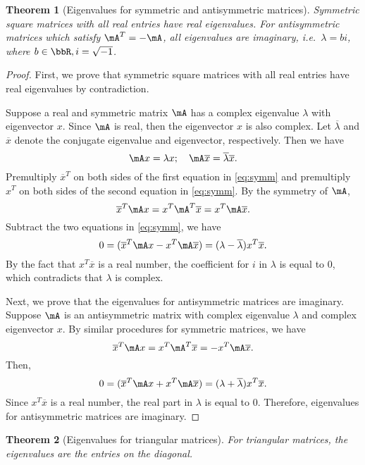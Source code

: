 \documentclass[11pt]{article}
\theoremstyle{plain}
\newtheorem{thm}{Theorem}[section]
\theoremstyle{definition}
\begin{document}
\begin{thm}[Eigenvalues for symmetric and antisymmetric matrices]\label{def:symmeign}
	Symmetric square matrices  with all real entries have real eigenvalues. For antisymmetric matrices which satisfy $\mA^T = - \mA$, all eigenvalues are imaginary, i.e.\ $\lambda = b i$, where $b \in \bbR, i = \sqrt{-1}$.
\end{thm}
\begin{proof}
	First, we prove that symmetric square matrices with all real entries have real eigenvalues by contradiction. 
	
	Suppose a real and symmetric matrix $\mA$ has a complex eigenvalue $\lambda$ with eigenvector $x$. Since $\mA$ is real, then the eigenvector $x$ is also complex. Let $\overline \lambda$ and $\overline x$ denote the conjugate eigenvalue and eigenvector, respectively. Then we have
	\begin{equation}\label{eq:symm}
		\mA x = \lambda x;\quad \mA \overline x = \overline \lambda \overline x.
	\end{equation} 
	Premultiply $\overline x^T$ on both sides of the first equation in \eqref{eq:symm} and premultiply $x^T$ on both sides of the second equation in \eqref{eq:symm}. By the symmetry of $\mA$,
	\[ \overline x^T \mA x  = x^T \mA^T \overline x = x^T \mA \overline x .\]
	Subtract the two equations in \eqref{eq:symm}, we have
	\[  0 = ( \overline x^T \mA x -  x^T \mA \overline x ) = (\lambda - \overline \lambda) x^T \overline x.  \]
	By the fact that $x^T \overline x$ is a real number, the coefficient for $i$ in $\lambda$ is equal to 0, which contradicts that $\lambda$ is complex.
	
	Next, we prove that the eigenvalues for antisymmetric matrices are imaginary. 
	Suppose $\mA$ is an antisymmetric matrix with complex eigenvalue $\lambda$ and complex eigenvector $x$.  By similar procedures for symmetric matrices, we have
	\[ \overline x^T \mA x  = x^T \mA^T \overline x  =  -x^T \mA \overline x .  \] 
	Then,
	\[  0 = ( \overline x^T \mA x +  x^T \mA \overline x ) = (\lambda + \overline \lambda) x^T \overline x.   \]
	Since $x^T \overline x$ is a real number, the real part in $\lambda$ is equal to 0. Therefore, eigenvalues for antisymmetric matrices are imaginary.
\end{proof}

\begin{thm}[Eigenvalues for triangular matrices]\label{thm:trianeigen}
	For triangular matrices, the eigenvalues are the entries on the diagonal.
\end{thm}
\end{document}
